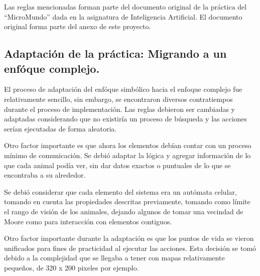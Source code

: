   Las reglas mencionadas forman parte del documento original de la práctica del ``MicroMundo'' dada en la asignatura de Inteligencia Artificial. El documento original forma parte del anexo de este proyecto.\cite{9}

\subsection{Adaptación de la práctica: Migrando a un enfóque complejo.}
  El proceso de adaptación del enfóque simbólico hacia el enfoque complejo fue relativamente sencillo, sin embargo, se encontraron diversos contratiempos durante el proceso de implementación. Las reglas debieron ser cambiadas y adaptadas considerando que no existiría un proceso de búsqueda y las acciones serían ejecutadas de forma aleatoria.

  Otro factor importante es que ahora los elementos debían contar con un proceso mínimo de comunicación. Se debió adaptar la lógica y agregar información de lo que cada animal podía ver, sin dar datos exactos o puntuales de lo que se encontraba a su alrededor.

  Se debió considerar que cada elemento del sistema era un autómata celular, tomando en cuenta las propiedades descritas previamente, tomando como límite el rango de visión de los animales, dejando algunos de tomar una vecindad de Moore como para interacción con elementos contiguos.

  Otro factor importante durante la adaptación es que los puntos de vida se vieron unificados para fines de practicidad al ejecutar las acciones. Esta decisión se tomó debido a la complejidad que se llegaba a tener con mapas relativamente pequeños, de 320 x 200 pixeles por ejemplo.

